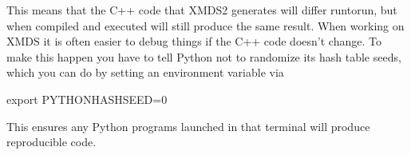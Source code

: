 \documentclass[letterpaper,10pt,english]{sphinxmanual}
\begin{document}
\sphinxAtStartPar
This means that the C++ code that XMDS2 generates will differ run\sphinxhyphen{}to\sphinxhyphen{}run, but when compiled and executed will still produce the same result. When working on XMDS it is often easier to debug things if the C++ code doesn’t change. To make this happen you have to tell Python not to randomize its hash table seeds, which you can do by setting an environment variable via

\begin{sphinxVerbatim}[commandchars=\\\{\}]
export PYTHONHASHSEED=0
\end{sphinxVerbatim}

\sphinxAtStartPar
This ensures any Python programs launched in that terminal will produce reproducible code.

\ignorespaces 
\end{document}
